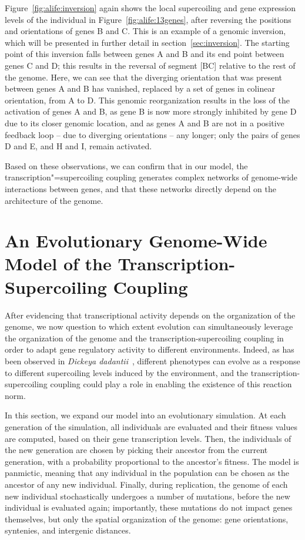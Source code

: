 Figure~\ref{fig:alife:inversion} again shows the local supercoiling and gene expression levels of the individual in Figure~\ref{fig:alife:13genes}, after reversing the positions and orientations of genes B and C.
This is an example of a genomic inversion, which will be presented in further detail in section~\ref{sec:inversion}.
The starting point of this inversion falls between genes A and B and its end point between genes C and D; this results in the reversal of segment [BC] relative to the rest of the genome.
Here, we can see that the diverging orientation that was present between genes A and B has vanished, replaced by a set of genes in colinear orientation, from A to D.
This genomic reorganization results in the loss of the activation of genes A and B, as gene B is now more strongly inhibited by gene D due to its closer genomic location, and as genes A and B are not in a positive feedback loop -- due to diverging orientations -- any longer; only the pairs of genes D and E, and H and I, remain activated.

Based on these observations, we can confirm that in our model, the transcription"=supercoiling coupling generates complex networks of genome-wide interactions between genes, and that these networks directly depend on the architecture of the genome.


\section{An Evolutionary Genome-Wide Model of the Transcription-Supercoiling Coupling}
\label{sec:alife:evol_model}

After evidencing that transcriptional activity depends on the organization of the genome, we now question to which extent evolution can simultaneously leverage the organization of the genome and the transcription-supercoiling coupling in order to adapt gene regulatory activity to different environments.
Indeed, as has been observed in \emph{Dickeya dadantii}~\citep{muskhelishvili2019}, different phenotypes can evolve as a response to different supercoiling levels induced by the environment, and the transcription-supercoiling coupling could play a role in enabling the existence of this reaction norm.

In this section, we expand our model into an evolutionary simulation.
At each generation of the simulation, all individuals are evaluated and their fitness values are computed, based on their gene transcription levels.
Then, the individuals of the new generation are chosen by picking their ancestor from the current generation, with a probability proportional to the ancestor's fitness.
The model is panmictic, meaning that any individual in the population can be chosen as the ancestor of any new individual.
Finally, during replication, the genome of each new individual stochastically undergoes a number of mutations, before the new individual is evaluated again; importantly, these mutations do not impact genes themselves, but only the spatial organization of the genome: gene orientations, syntenies, and intergenic distances.

